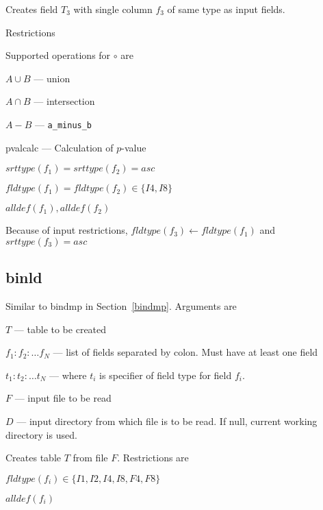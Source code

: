 Creates field \(T_3\) with single column \(f_3\) of same type as input
fields. 

Restrictions
\be
\item Supported operations for \(\circ\) are 
\be
\item \(A \cup B\) --- union
\item \(A \cap B\) --- intersection
\item \(A - B\) --- \verb+a_minus_b+
\item pvalcalc --- Calculation of \(p\)-value
\ee
\item \(srttype(f_1) = srttype(f_2) = asc\) 
\item \(fldtype(f_1) = fldtype(f_2)  \in \{I4, I8\}\)
\item \(alldef(f_1),  alldef(f_2)\)
\item Because of input restrictions, 
  \(fldtype(f_3) \leftarrow fldtype(f_1)\) and \(srttype(f_3) = asc\)
\ee


\subsection{binld}
\label{binld}
Similar to bindmp in Section~\ref{bindmp}.
Arguments are
\be
\item \(T\) --- table to be created
\item \(f_1:f_2:\ldots f_N\) --- list of fields separated by colon. Must
have at least one field
\item \(t_1:t_2:\ldots t_N\) --- where \(t_i\) is specifier of field
type for field \(f_i\). 
\item \(F\) --- input file to be read
\item \(D\) --- input directory from which file is to be read. If
null, current working directory is used. 
\ee

Creates table \(T\) from file \(F\). Restrictions are 
\be
\item \(fldtype(f_i) \in \{I1, I2, I4, I8, F4, F8\}\)
\item \(alldef(f_i)\)
\ee

